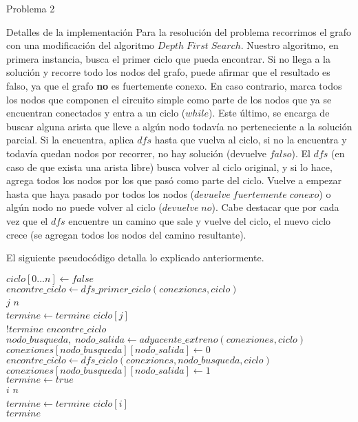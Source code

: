 \begin{section}{Problema 2}
\begin{subsection}{Detalles de la implementación}
		Para la resolución del problema recorrimos el grafo con una modificación del algoritmo $Depth\; First\; Search$. Nuestro algoritmo, en primera instancia, busca el primer ciclo que pueda encontrar. Si no llega a la solución y recorre todo los nodos del grafo, puede afirmar que el resultado es falso, ya que el grafo \textbf{no} es fuertemente conexo. En caso contrario, marca todos los nodos que componen el circuito simple como parte de los nodos que ya se encuentran conectados y entra a un ciclo ($while$). Este último, se encarga de buscar alguna arista que lleve a algún nodo todavía no perteneciente a la solución parcial. Si la encuentra, aplica $dfs$ hasta que vuelva al ciclo, si no la encuentra y todavía quedan nodos por recorrer, no hay solución (devuelve $falso$). El $dfs$ (en caso de que exista una arista libre) busca volver al ciclo original, y si lo hace, agrega todos los nodos por los que pasó como parte del ciclo. Vuelve a empezar hasta que haya pasado por todos los nodos ($devuelve\; fuertemente\; conexo$) o algún nodo no puede volver al ciclo ($devuelve\; no$). Cabe destacar que por cada vez que el $dfs$ encuentre un camino que sale y vuelve del ciclo, el nuevo ciclo crece (se agregan todos los nodos del camino resultante).\VSP

		El siguiente pseudocódigo detalla lo explicado anteriormente.

		\begin{pseudo}
		\tab $ciclo[0...n] \leftarrow false$\\
		\tab $encontre\_ciclo \leftarrow dfs\_primer\_ciclo(conexiones,ciclo)$\\
		\tab \FOR $j$ \TO $n$\\
		\tab \tab $termine \leftarrow termine$ \AND $ciclo[j]$\\
		\tab \WHILE $!termine$ \AND $encontre\_ciclo$\\
		\tab \tab $nodo\_busqueda,\;nodo\_salida \leftarrow adyacente\_extreno(conexiones,ciclo)$\\
		\tab \tab $conexiones[nodo\_busqueda][nodo\_salida] \leftarrow 0$\\
		\tab \tab $encontre\_ciclo \leftarrow dfs\_ciclo(conexiones,nodo\_busqueda,ciclo)$\\
		\tab \tab $conexiones[nodo\_busqueda][nodo\_salida] \leftarrow 1$\\
		\tab \tab $termine \leftarrow true$\\
		\tab \tab \FOR $i$ \TO $n$\\
		\tab \tab \tab $termine \leftarrow termine$ \AND $ciclo[i]$\\
		\tab \RET $termine$\\
		\end{pseudo}


\end{subsection}
\end{section}
